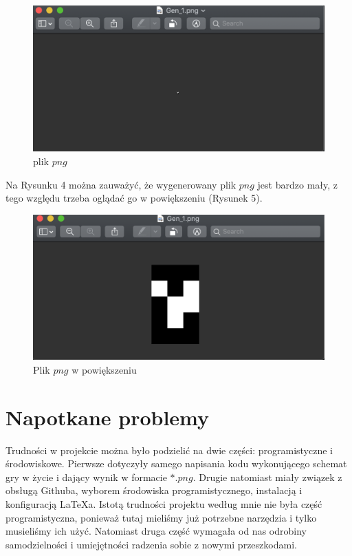 \documentclass[11pt]{article}
\begin{document}
\begin{figure}[h!]
	\includegraphics[width=\linewidth]{png.png}
	\caption{plik $png$}
	\label{fig:png1}
\end{figure}
Na Rysunku 4 można zauważyć, że wygenerowany plik $png$ jest bardzo mały, z tego względu trzeba oglądać go w powiększeniu (Rysunek 5).\\
\begin{figure}[h!]
	\includegraphics[width=\linewidth]{powiekszenie.png}
	\caption{Plik $png$ w powiększeniu}
\end{figure}


\section{Napotkane problemy}
Trudności w projekcie można było podzielić na dwie części: programistyczne i środowiskowe. Pierwsze dotyczyły samego napisania kodu wykonującego schemat gry w życie i dający wynik w formacie $*.png$. Drugie natomiast miały związek z obsługą Githuba, wyborem środowiska programistycznego, instalacją i konfiguracją LaTeXa. Istotą trudności projektu według mnie nie była część programistyczna, ponieważ tutaj mieliśmy już potrzebne narzędzia i tylko musieliśmy ich użyć. Natomiast druga część wymagała od nas odrobiny samodzielności i umiejętności radzenia sobie z nowymi przeszkodami.
\end{document}
